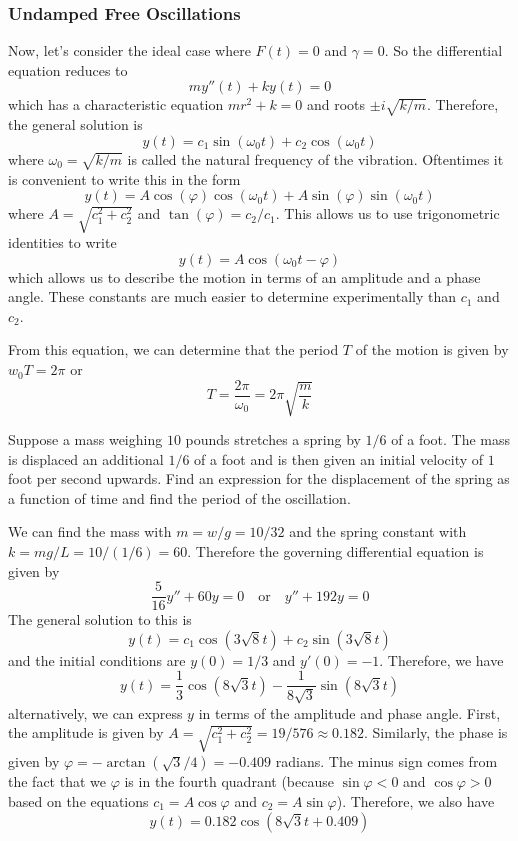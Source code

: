 \subsubsection{Undamped Free Oscillations}
Now, let's consider the ideal case where $F(t) = 0$ and $\gamma = 0$. So the differential equation reduces to
\[ my''(t) + ky(t) = 0 \]
which has a characteristic equation $mr^2 + k = 0$ and roots $\pm i\sqrt{k/m}$. Therefore, the general solution is
\[ y(t) = c_1\sin(\omega_0 t) + c_2\cos(\omega_0 t)\]
where $\omega_0 = \sqrt{k/m}$ is called the natural frequency of the vibration. Oftentimes it is convenient to write this in the form
\[ y(t) = A\cos(\varphi)\cos(\omega_0 t) + A\sin(\varphi)\sin(\omega_0 t)\] 
where $A = \sqrt{c_1^2+c_2^2}$ and $\tan(\varphi) = c_2/c_1$. This allows us to use trigonometric identities to write
\[ y(t) = A\cos(\omega_0 t - \varphi) \]
which allows us to describe the motion in terms of an amplitude and a phase angle. These constants are much easier to determine experimentally than $c_1$ and $c_2$. \par
From this equation, we can determine that the period $T$ of the motion is given by $w_0T = 2\pi$ or 
\[ T = \frac{2\pi}{\omega_0} = 2\pi \sqrt{\frac{m}{k}} \]
\begin{example}
    Suppose a mass weighing $10$ pounds stretches a spring by $1/6$ of a foot. The mass is displaced an additional $1/6$ of a foot and is then given an initial velocity of $1$ foot per second upwards. Find an expression for the displacement of the spring as a function of time and find the period of the oscillation. \par
    We can find the mass with $m = w/g = 10/32$ and the spring constant with $k = mg/L = 10/(1/6) = 60$. Therefore the governing differential equation is given by
    \[ \frac{5}{16}y'' + 60y = 0\quad\text{or}\quad y'' + 192y = 0\]
    The general solution to this is
    \[ y(t) = c_1 \cos(3\sqrt{8} t) + c_2\sin(3\sqrt{8} t) \]
    and the initial conditions are $y(0) = 1/3$ and $y'(0) = -1$. Therefore, we have
    \[ y(t) = \frac{1}{3}\cos(8\sqrt{3}t) - \frac{1}{8\sqrt{3}}\sin(8\sqrt{3} t) \]
    alternatively, we can express $y$ in terms of the amplitude and phase angle. First, the amplitude is given by $A = \sqrt{c_1^2+c_2^2} = 19/576 \approx 0.182$. Similarly, the phase is given by $\varphi = - \arctan({\sqrt 3/4}) = -0.409$ radians. The minus sign comes from the fact that we $\varphi$ is in the fourth quadrant (because $\sin \varphi < 0$ and $\cos\varphi > 0$ based on the equations $c_1 = A\cos\varphi$ and $c_2 = A\sin\varphi$). Therefore, we also have
    \[ y(t) = 0.182\cos(8\sqrt 3 t + 0.409) \]
\end{example}
